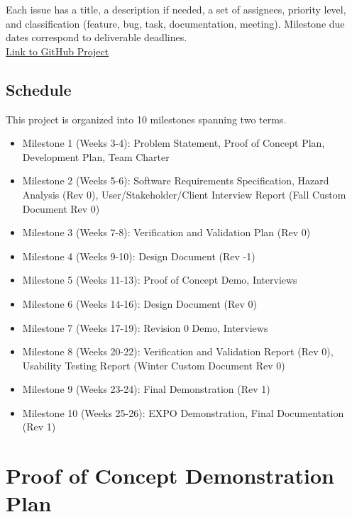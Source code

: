 \documentclass{article}
\begin{document}
Each issue has a title, a description if needed, a set of assignees, priority
level, and classification (feature, bug, task, documentation, meeting).
Milestone due dates correspond to deliverable deadlines.\\

\noindent\href{https://github.com/users/Ayushpatel2026/projects/3}{Link to GitHub Project}

\subsection*{Schedule}

This project is organized into 10 milestones spanning two terms.

\begin{itemize}
    \item Milestone 1 (Weeks 3-4): Problem Statement, Proof of Concept Plan,
          Development Plan, Team Charter
    \item Milestone 2 (Weeks 5-6): Software Requirements Specification, Hazard
          Analysis (Rev 0), User/Stakeholder/Client Interview Report (Fall
          Custom Document Rev 0)
    \item Milestone 3 (Weeks 7-8): Verification and Validation Plan (Rev 0)
    \item Milestone 4 (Weeks 9-10): Design Document (Rev -1)
    \item Milestone 5 (Weeks 11-13): Proof of Concept Demo, Interviews
    \item Milestone 6 (Weeks 14-16): Design Document (Rev 0)
    \item Milestone 7 (Weeks 17-19): Revision 0 Demo, Interviews
    \item Milestone 8 (Weeks 20-22): Verification and Validation Report (Rev
          0), Usability Testing Report (Winter Custom Document Rev 0)
    \item Milestone 9 (Weeks 23-24): Final Demonstration (Rev 1)
    \item Milestone 10 (Weeks 25-26): EXPO Demonstration, Final Documentation
          (Rev 1)
\end{itemize}

\section{Proof of Concept Demonstration Plan}

\end{document}
